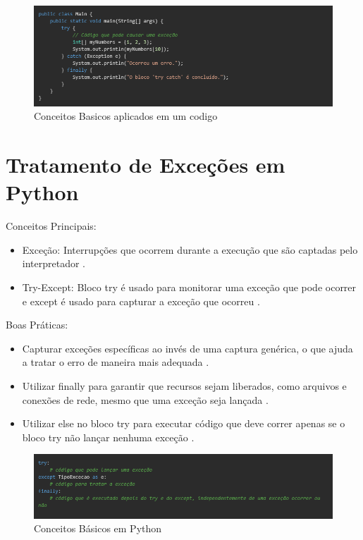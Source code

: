 \documentclass[12pt,a4paper]{article}
\begin{document}
\begin{figure}[h]
    \centering
    \includegraphics[width=\textwidth]{java2.png}
    \caption{Conceitos Basicos aplicados em um codigo}
    \label{fig:imagem2}
\end{figure}

\section{Tratamento de Exceções em Python}
Conceitos Principais:
\begin{itemize}
    \item Exceção: Interrupções que ocorrem durante a execução que são captadas pelo interpretador \cite{python_doc}.
    \item Try-Except: Bloco try é usado para monitorar uma exceção que pode ocorrer e except é usado para capturar a exceção que ocorreu \cite{python_doc}.
\end{itemize}
Boas Práticas:
\begin{itemize}
    \item Capturar exceções específicas ao invés de uma captura genérica, o que ajuda a tratar o erro de maneira mais adequada \cite{python_practices}.
    \item Utilizar finally para garantir que recursos sejam liberados, como arquivos e conexões de rede, mesmo que uma exceção seja lançada \cite{python_doc}.
    \item Utilizar else no bloco try para executar código que deve correr apenas se o bloco try não lançar nenhuma exceção \cite{python_practices}.
\end{itemize}

\begin{figure}[h]
    \centering
    \includegraphics[width=\textwidth]{python.png}
    \caption{Conceitos Básicos em Python}
    \label{fig:imagem2}
\end{figure}
\end{document}
